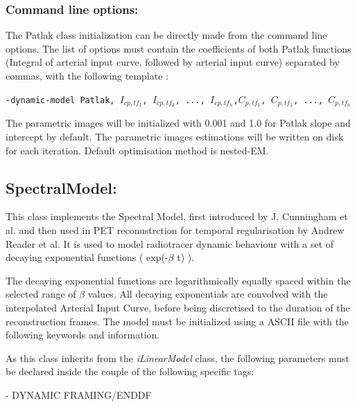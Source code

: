 \documentclass[a4paper, 11pt]{article}
\begin{document}
\subsubsection{Command line options:}
\label{sss_patlak_list}

The Patlak class initialization can be directly made from the command line options. The list of options must contain the coefficients of both Patlak functions (Integral of arterial input curve, followed by arterial input curve) separated by commas, with the following template :

\bigskip
\texttt{-dynamic-model Patlak,  $I_{cp,tf_1}$, $I_{cp,tf_2}$, ..., $I_{cp,tf_n}$,$C_{p,tf_1}$, $C_{p,tf_2}$, ..., $C_{p,tf_n}$}
\bigskip

The parametric images will be initialized with 0.001 and 1.0 for Patlak slope and intercept by default. The parametric images estimations will be written on disk for each iteration. Default optimisation method is nested-EM.



\newpage
\subsection{SpectralModel:}
\label{ss_spectral}

This class implements the Spectral Model, first introduced by J. Cunningham et al. and then used in PET reconustrction for temporal regularisation by Andrew Reader et al. It is used to model radiotracer dynamic behaviour with a set of decaying exponential functions ( exp(-$\beta$ t) ).

The decaying exponential functions are logarithmically equally spaced within the selected range of $\beta$ values. All decaying exponentials are convolved with the interpolated Arterial Input Curve, before being discretised to the duration of the reconstruction frames. The model must be initialized using a ASCII file with the following keywords and information.

As this class inherits from the \textit{iLinearModel} class, the following parameters must be declared inside the couple of the following specific tags:

   - DYNAMIC FRAMING/ENDDF
\end{document}
